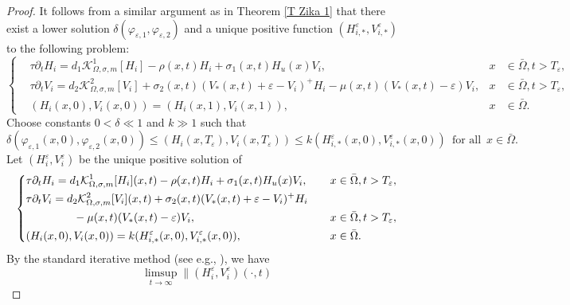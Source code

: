 \documentclass[11pt,reqno]{amsart}
\numberwithin{equation}{section}
\begin{document}
\begin{proof}
It follows from a similar argument as in Theorem \ref{T Zika 1} that there exist a lower solution $\delta(\varphi_{\varepsilon,1}, \varphi_{\varepsilon,2} )$ and a unique positive function $(H_{i,*}^{\varepsilon},V_{i,*}^{\varepsilon})$ to the following problem:
\begin{equation*}
\left\{
\begin{aligned}
& \tau \partial_{t} H_{i}
=d_{1}\mathcal{K}^{1}_{\Omega,\sigma,m}[H_{i}]-\rho(x,t)H_{i}+\sigma_{1}(x,t)H_{u}(x)V_{i}, &x&\in\bar\Omega, t>T_{\varepsilon},\\
& \tau \partial_{t} V_{i}
=
d_{2}\mathcal{K}^{2}_{\Omega,\sigma,m}[V_{i}]+\sigma_{2}(x,t)(V_{*}(x,t)+\varepsilon-V_{i})^{+}H_{i}-\mu(x,t)(V_{*}(x,t)-\varepsilon)V_{i}, &x&\in\bar\Omega, t>T_{\varepsilon},\\
&(H_{i}(x,0), V_{i}(x,0))=(H_{i}(x,1), V_{i}(x,1)), &x&\in \bar\Omega.
\end{aligned}
\right.
\end{equation*}
Choose constants $0 < \delta\ll 1$ and $k\gg 1$ such that
\begin{equation*}
\delta (\varphi_{\varepsilon,1}(x,0), \varphi_{\varepsilon,2}(x,0) )
\leq
\left( H_{i}(x,T_{\varepsilon}),V_{i}(x,T_{\varepsilon}) \right)
\leq
k(H_{i,*}^{\varepsilon}(x,0),V_{i,*}^{\varepsilon}(x,0))
\enspace\text{for all}\enspace
x\in\bar{\Omega}.
\end{equation*}
%
Let $(H_{i}^{\varepsilon},V_{i}^{\varepsilon})$ be the unique positive solution of
%
\begin{equation*}
\left\{
\begin{aligned}
& \tau \partial_{t} H_{i}
=d_{1}\mathcal{K}^{1}_{\Omega,\sigma,m}[H_{i}](x,t)-\rho(x,t)H_{i}+\sigma_{1}(x,t)H_{u}(x)V_{i},&\quad &x\in\bar\Omega, t>T_{\varepsilon},\\
& \tau \partial_{t} V_{i}
=
d_{2}\mathcal{K}^{2}_{\Omega,\sigma,m}[V_{i}](x,t)+\sigma_{2}(x,t)(V_{*}(x,t)+\varepsilon-V_{i})^{+}H_{i}\\
&\hspace{1.5cm}-\mu(x,t)(V_{*}(x,t)-\varepsilon)V_{i},&\quad &x\in\bar\Omega, t>T_{\varepsilon},\\
&(H_{i}(x,0), V_{i}(x,0))=k(H_{i,*}^{\varepsilon}(x,0),V_{i,*}^{\varepsilon}(x,0)),&\quad&x\in \bar\Omega.
\end{aligned}
\right.
\end{equation*}
By the standard iterative method (see e.g., \cite[Theorem 1.1]{Bao}), we have
\begin{equation*}
\limsup\limits_{t\to\infty} \| (H_{i}^{\varepsilon},V_{i}^{\varepsilon})(\cdot,t)

\end{equation*}
\end{proof}
\end{document}
